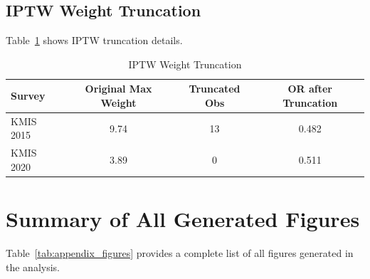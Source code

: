 \subsection{IPTW Weight Truncation}

Table~\ref{tab:appendix_iptw} shows IPTW truncation details.

\begin{table}[htbp]
	\centering
	\caption{IPTW Weight Truncation}
	\label{tab:appendix_iptw}
	\begin{tabular}{@{}lccc@{}}
		\toprule
		\textbf{Survey} & \textbf{Original Max Weight} & \textbf{Truncated Obs} & \textbf{OR after Truncation} \\
		\midrule
		KMIS 2015 & 9.74 & 13 & 0.482 \\
		KMIS 2020 & 3.89 & 0 & 0.511 \\
		\bottomrule
	\end{tabular}
\end{table}

\section{Summary of All Generated Figures}

Table~\ref{tab:appendix_figures} provides a complete list of all figures generated in the analysis.

